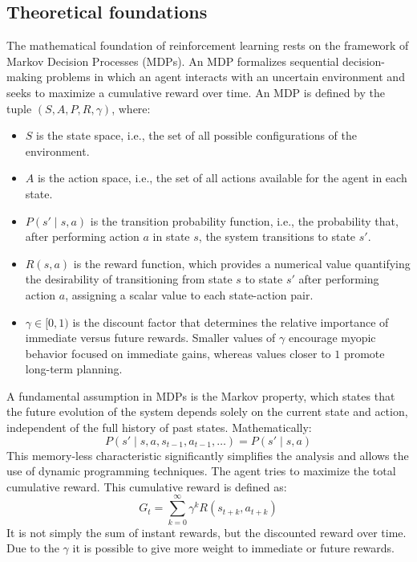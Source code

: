 \documentclass[12pt,a4paper]{report}
\begin{document}
\subsection{Theoretical foundations}
The mathematical foundation of reinforcement learning rests on the framework of Markov Decision Processes (MDPs). 
An MDP formalizes sequential decision-making problems in which an agent interacts with an uncertain environment and seeks to maximize a cumulative reward over time. 
An MDP is defined by the tuple $(S, A, P, R, \gamma)$, where:
\begin{itemize}
    \item $S$ is the state space, i.e., the set of all possible configurations of the environment.
    
    \item $A$ is the action space, i.e., the set of all actions available for the agent in each state.
    
    \item $P(s' \mid s, a)$ is the transition probability function, i.e., the probability that, after performing action 
    $a$ in state $s$, the system transitions to state $s'$.
    
    \item $R(s, a)$ is the reward function, which provides a numerical value quantifying the desirability of transitioning 
    from state $s$ to state $s'$ after performing action $a$, assigning a scalar value to each state-action pair.
    
    \item $\gamma \in [0,1)$ is the discount factor that determines the relative importance of immediate versus future rewards. 
    Smaller values of $\gamma$ encourage myopic behavior focused on immediate gains, whereas values closer to $1$ promote long-term planning.
\end{itemize}
A fundamental assumption in MDPs is the Markov property, which states that the future evolution of the system depends solely on the current state and action, independent of the full history of past states. 
Mathematically:
\[
P(s' \mid s, a, s_{t-1}, a_{t-1}, \dots) = P(s' \mid s, a)
\]
This memory-less characteristic significantly simplifies the analysis and allows the use of dynamic programming techniques. 
The agent tries to maximize the total cumulative reward. This cumulative reward is defined as:
\[
G_t = \sum_{k=0}^{\infty} \gamma^k R(s_{t+k}, a_{t+k})
\]
It is not simply the sum of instant rewards, but the discounted reward over time. Due to the $\gamma$ it is possible to give more 
weight to immediate or future rewards.
\end{document}

